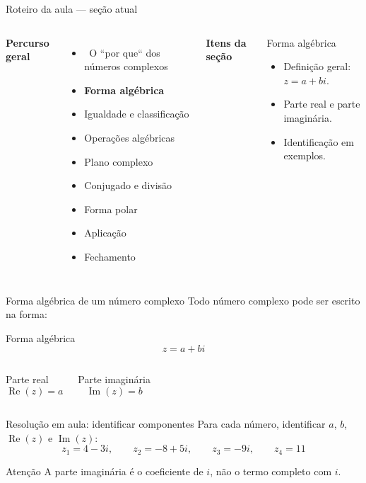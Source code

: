 \documentclass[aspectratio=169]{beamer}
\newcommand{\EspacoEscrita}[1]{%
  \vspace{0.25em}
  \begin{minipage}[t][#1][t]{\linewidth}
  \end{minipage}
}
\newcommand{\secaoPassada}[1]{{\color{ThemeSecondary}\checkmark\ #1}}
\newcommand{\secaoAtual}[1]{{\color{ThemeAccent}\textbf{\large #1}}}
\newcommand{\secaoFutura}[1]{{\color{ThemeDark!55}#1}}
\newcommand{\MapaSecao}[3]{%
\begin{frame}{Roteiro da aula — seção atual}
\vspace{-0.55em}
\begin{columns}[T,onlytextwidth]
\column{0.54\textwidth}
\footnotesize
\textbf{Percurso geral}\par\vspace{0.25em}
#1
\column{0.03\textwidth}
\column{0.35\textwidth}
\footnotesize
\textbf{Itens da seção}\par\vspace{0.25cm}
\begin{block}{#2}
#3
\end{block}
\column{0.03\textwidth}
\end{columns}
\end{frame}
}
\begin{document}
\MapaSecao{
\begin{itemize}
  \item \secaoPassada{O ``por que`` dos números complexos}
  \item \secaoAtual{Forma algébrica}
  \item \secaoFutura{Igualdade e classificação}
  \item \secaoFutura{Operações algébricas}
  \item \secaoFutura{Plano complexo}
  \item \secaoFutura{Conjugado e divisão}
  \item \secaoFutura{Forma polar}
  \item \secaoFutura{Aplicação}
  \item \secaoFutura{Fechamento}
\end{itemize}
}{Forma algébrica}{
\begin{itemize}
  \item Definição geral: $z=a+bi$.
  \item Parte real e parte imaginária.
  \item Identificação em exemplos.
\end{itemize}
}

\begin{frame}{Forma algébrica de um número complexo}
\vspace{-0.3em}
\small
Todo número complexo pode ser escrito na forma:

\vspace{0.5em}
\begin{block}{Forma algébrica}
\[
  z=a+bi
\]
\end{block}

\vspace{0.4em}
\begin{columns}[T,onlytextwidth]
\begin{block}{Parte real}
\[
  \operatorname{Re}(z)=a
\]
\end{block}
\begin{block}{Parte imaginária}
\[
  \operatorname{Im}(z)=b
\]
\end{block}
\end{columns}
\end{frame}

\begin{frame}{Resolução em aula: identificar componentes}
\vspace{-0.2em}
\small
Para cada número, identificar $a$, $b$, $\operatorname{Re}(z)$ e $\operatorname{Im}(z)$:
\[
  z_1=4-3i, \qquad z_2=-8+5i, \qquad z_3=-9i, \qquad z_4=11
\]
\begin{block}{Atenção}
A parte imaginária é o coeficiente de $i$, não o termo completo com $i$.
\end{block}
\EspacoEscrita{0.39\textheight}
\end{frame}
\end{document}
